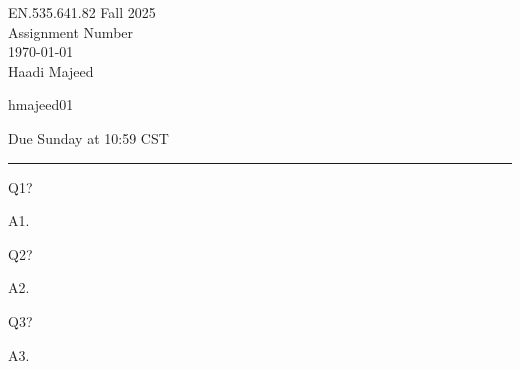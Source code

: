 \documentclass[12pt,letterpaper, onecolumn]{exam}
\begin{document}
\begingroup  
    \centering
    \LARGE EN.535.641.82 Fall 2025\\
    \LARGE Assignment Number\\[0.5em]
    \large \today\\[0.5em]
    \large Haadi Majeed\par
    \large hmajeed01\par
    \large Due Sunday at 10:59 CST\par
\endgroup
\rule{\textwidth}{0.4pt}
\printanswers
\renewcommand{\solutiontitle}{\noindent\textbf{Ans:}\enspace}

\begin{questions}

    \question Q1?
    
    \begin{solution}
            A1.
    \end{solution}
    
    \question Q2? 
    
    \begin{solution}
            A2.
    \end{solution}

    \question Q3?
    
    \begin{solution}
            A3.
    \end{solution}
    
\end{questions}
\end{document}
